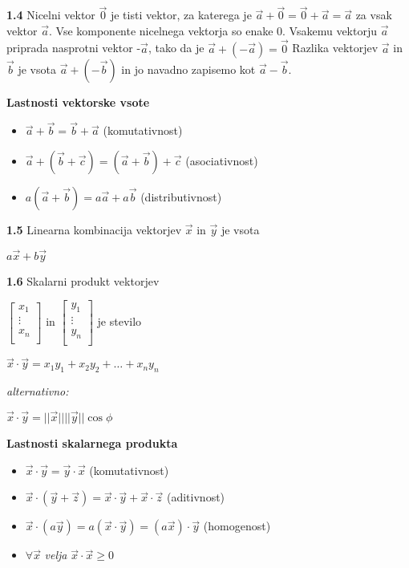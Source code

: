 \documentclass{article}
\begin{document}
\begin{multicols}{4}
\textbf{1.4} Nicelni vektor $\vec{0}$ je tisti vektor, za katerega
je $\vec{a} + \vec{0} = \vec{0} + \vec{a} = \vec{a}$ za vsak vektor
$\vec{a}$. Vse komponente nicelnega vektorja so enake 0. Vsakemu vektorju
$\vec{a}$ priprada nasprotni vektor -$\vec{a}$, tako da je $\vec{a} + (-\vec{a}) = \vec{0}$
Razlika vektorjev $\vec{a}$ in $\vec{b}$ je vsota $\vec{a} + (-\vec{b})$ in jo
navadno zapisemo kot  $\vec{a} - \vec{b}$.

\textbf{Lastnosti vektorske vsote}
\begin{itemize}
    \item $\vec{a} + \vec{b} = \vec{b} + \vec{a}$ (komutativnost)
    \item $\vec{a} + (\vec{b} + \vec{c}) = (\vec{a} + \vec{b}) + \vec{c}$ (asociativnost)
    \item $a(\vec{a} + \vec{b}) = a\vec{a} + a\vec{b}$ (distributivnost)
\end{itemize}

\textbf{1.5} Linearna kombinacija vektorjev $\vec{x}$ in $\vec{y}$ je vsota
\begin{center}
    $a\vec{x} + b\vec{y}$
\end{center}

\textbf{1.6} Skalarni produkt vektorjev\\
\begin{center}
    $\begin{bmatrix} 
        x_{1}\\ 
        \vdots\\ 
        x_{n}\\
    \end{bmatrix}$ in
    $\begin{bmatrix} 
        y_{1}\\ 
        \vdots\\ 
        y_{n}\\
    \end{bmatrix}$ je stevilo    
\end{center}
\begin{center}
    $\vec{x} \cdot \vec{y} = x_{1}y_{1} + x_{2}y_{2} + \dots + x_{n}y_{n}$
\end{center} \textit{alternativno:}
\begin{center}
    $\vec{x} \cdot \vec{y} = ||\vec{x}|| ||\vec{y}|| \cos \phi$
\end{center}

\textbf{Lastnosti skalarnega produkta}
\begin{itemize}
    \item $\vec{x} \cdot \vec{y} = \vec{y} \cdot \vec{x}$ (komutativnost)
    \item $\vec{x} \cdot (\vec{y} + \vec{z}) = \vec{x} \cdot \vec{y} + \vec{x} \cdot \vec{z}$ (aditivnost)
    \item $\vec{x} \cdot (a \vec{y}) = a(\vec{x} \cdot \vec{y}) = (a \vec{x}) \cdot \vec{y}$ (homogenost)
    \item $\forall \vec{x}$ \textit{velja} $\vec{x} \cdot \vec{x} \geq 0$
\end{itemize}


\end{multicols}
\end{document}
